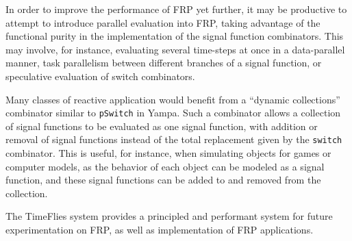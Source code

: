 In order to improve the performance of FRP yet further, it may be productive to attempt
to introduce parallel evaluation into FRP, taking advantage of the functional purity in
the implementation of the signal function combinators. This may involve, for instance,
evaluating several time-steps at once in a data-parallel manner, task parallelism
between different branches of a signal function, or speculative evaluation of switch
combinators.

Many classes of reactive application would benefit from a ``dynamic collections'' combinator
similar to {\tt pSwitch} in Yampa. Such a combinator allows a collection of signal functions
to be evaluated as one signal function, with addition or removal of signal functions instead
of the total replacement given by the {\tt switch} combinator. This is useful, for instance,
when simulating objects for games or computer models, as the behavior of each object can be
modeled as a signal function, and these signal functions can be added to and removed from the
collection.

The TimeFlies system provides a principled and performant system for future experimentation
on FRP, as well as implementation of FRP applications.
